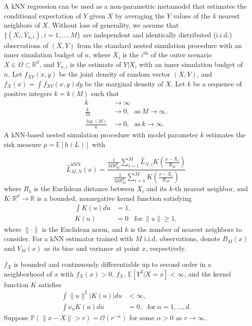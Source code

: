 A kNN regression can be used as a non-parametric metamodel that estimates the conditional expectation of $Y$ given $X$ by averaging the $Y$ values of the $k$ nearest neighbors of $X$.
Without loss of generality, we assume that $\{(X_i, \bar{Y}_{n, i}), i = 1, \dots, M\}$ are independent and identically distributed (i.i.d.) observations of $(X, Y)$ from the standard nested simulation procedure with an inner simulation budget of $n$, where $X_i$ is the $i^{\text{th}}$ of the outer scenario $X \in \Omega \subset \mathbb{R}^d$, and $\bar{Y}_{n, i}$ is the estimate of $Y|X_i$ with an inner simulation budget of $n$.
Let $f_{XY}(x, y)$ be the joint density of random vector $(X, Y)$, and $f_X(x) = \int f_{XY}(x, y) dy$ be the marginal density of $X$.
Let $k$ be a sequence of positive integers $k = k(M)$ such that 
\begin{align*}
    k                   & \rightarrow \infty \\
    \frac{k}{M}         & \rightarrow 0, ~~~ \text{as} ~ M \rightarrow \infty. \\
    \frac{\log(M)}{k}   & \rightarrow 0, ~~~ \text{as} ~ k \rightarrow \infty.
\end{align*}
A kNN-based nested simulation procedure with model parameter $k$ estimates the risk measure $\rho = \mathbb{E} \left[ h(L) \right]$ with

\begin{equation*}
    \hat{L}^{\text{kNN}}_{M, N}(x) 
    = \frac{\frac{1}{M R_M^d} \sum_{i=1}^M \hat{L}_{N, i} K\left(\frac{x - X_i}{R_M}\right)}{\frac{1}{M R_M^d} \sum_{i=1}^M K\left(\frac{x - X_i}{R_M}\right)}
    \end{equation*}
    where $R_k$ is the Euclidean distance between $X_i$ and its $k$-th nearest neighbor, and $K:\mathbb{R}^d \rightarrow \mathbb{R}$ is a bounded, nonnegative kernel function satisfying 
    \begin{align*}
        \int K(u) du & = 1, \\
        K(u) &= 0 ~~~ ~\text{for}~ \|u\| \geq 1,
    \end{align*}
where $\|\cdot\|$ is the Euclidean norm, and $k$ is the number of nearest neighbors to consider.
For a kNN estimator trained with $M$ i.i.d. observations, denote $B_M(x)$ and $V_M(x)$ as its bias and variance at point $x$, respectively.

\begin{assumption} \label{as1:knn}
    $f_X$ is bounded and continuously differentiable up to second order in a neighborhood of $x$ with $f_X(x) > 0$, $f_X$, $\mathbb{E} \left[ Y^2| X = x \right] < \infty$, and the kernel function $K$ satisfies
    \begin{align*}
        \int \|u\|^2  |K(u)| du & < \infty, \\
        \int \nu_\alpha K(u) du & = 0, ~~~ \text{for}~ \alpha = 1, \dots, d.
    \end{align*}
    Suppose $\mathbb{P}(\|x - X\| > r) = \mathcal{O}(r^{-\alpha})$ for some $\alpha > 0$ as $r \rightarrow \infty$.
\end{assumption}

